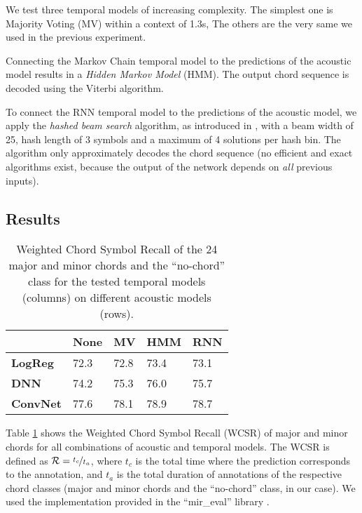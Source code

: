 \documentclass[twocolumn]{article}
\begin{document}
We test three temporal models of increasing complexity.  The simplest one is
Majority Voting (MV) within a context of 1.3s, The others are the very same we
used in the previous experiment.

Connecting the Markov Chain temporal model to the predictions of the acoustic
model results in a \emph{Hidden Markov Model} (HMM). The output chord sequence
is decoded using the Viterbi algorithm.

To connect the RNN temporal model to the predictions of the acoustic model,
we apply the \emph{hashed beam search} algorithm, as introduced in
\cite{sigtia_audio_2015}, with a beam width of 25, hash length of 3 symbols
and a maximum of 4 solutions per hash bin. The algorithm only approximately
decodes the chord sequence (no efficient and exact algorithms exist, because
the output of the network depends on \emph{all} previous inputs).

\subsection{Results}

\begin{table}[]
\centering
\begin{tabular}{@{}lllll@{}}
\toprule
                 & \textbf{None} & \textbf{MV} & \textbf{HMM} & \textbf{RNN} \\ \midrule
\textbf{LogReg}  & 72.3          & 72.8        & 73.4         & 73.1         \\
\textbf{DNN}     & 74.2          & 75.3        & 76.0         & 75.7         \\
\textbf{ConvNet} & 77.6          & 78.1        & 78.9         & 78.7         \\ \bottomrule
\end{tabular}
\caption{Weighted Chord Symbol Recall of the 24 major and minor chords and the
         ``no-chord'' class for the tested temporal models (columns) on
         different acoustic models (rows).}
\label{tab:res_chordrec}
\end{table}

Table \ref{tab:res_chordrec} shows the Weighted Chord Symbol Recall (WCSR) of
major and minor chords for all combinations of acoustic and temporal models.
The WCSR is defined as \(\mathcal{R} = \nicefrac{t_{c}}{t_{a}}\), where $t_c$
is the total time where the prediction corresponds to the annotation, and $t_a$
is the total duration of annotations of the respective chord classes (major and
minor chords and the ``no-chord'' class, in our case). We used the
implementation provided in the ``mir\_eval'' library \cite{raffel_mir_2014}.
\end{document}
